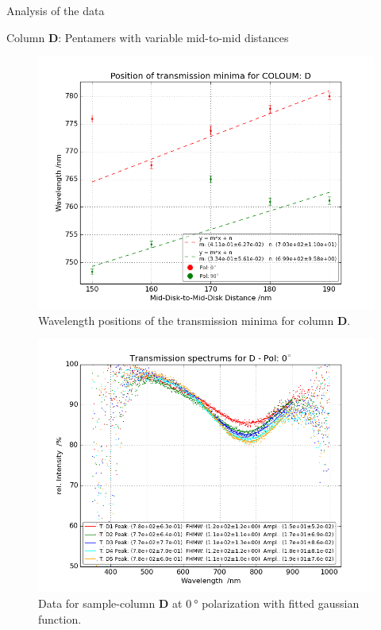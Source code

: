 \documentclass[pdftex, a4paper,11pt, twoside, UKenglish]{report}
\begin{document}
\begin{chapter}{Analysis of the data}
\begin{section}{Column \textbf{D}: Pentamers with variable mid-to-mid
        distances}
      \begin{figure}[b!]
        \centering
        \includegraphics[width=\textwidth]{Figures/MinimaPosD.png}
        \caption{Wavelength positions of the transmission minima for column
            \textbf{D}.}
        \label{fig:MinimaPosD}
      \end{figure}
      \newpage
      \begin{figure}[ht!]
        \centering
        \begin{minipage}{.95\textwidth}
          \centering
          \includegraphics[width=\textwidth]
              {Figures/TransspecFIT_DPol0.png}
          \caption{Data for sample-column \textbf{D} at $\SI{0}{\degree}$
              polarization with fitted gaussian function.}

\end{minipage}
\end{figure}
\end{section}
\end{chapter}
\end{document}
